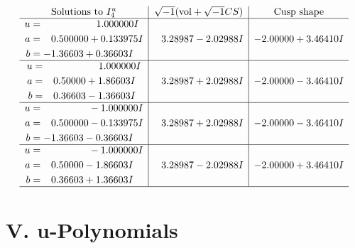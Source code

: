 \documentclass[1p]{elsarticle_modified}
\theoremstyle{definition}
\newcommand{\I}{\sqrt{-1}}
\begin{document}
$$\begin{array}{c|c|c}  
\text{Solutions to }I^u_{4}& \I (\text{vol} + \sqrt{-1}CS) & \text{Cusp shape}\\
 \hline 
\begin{aligned}
u &= \phantom{-0.000000 -}1.000000 I \\
a &= \phantom{-}0.500000 + 0.133975 I \\
b &= -1.36603 + 0.36603 I\end{aligned}
 & \phantom{-}3.28987 - 2.02988 I & -2.00000 + 3.46410 I \\ \hline\begin{aligned}
u &= \phantom{-0.000000 -}1.000000 I \\
a &= \phantom{-}0.50000 + 1.86603 I \\
b &= \phantom{-}0.36603 - 1.36603 I\end{aligned}
 & \phantom{-}3.28987 + 2.02988 I & -2.00000 - 3.46410 I \\ \hline\begin{aligned}
u &= \phantom{-0.000000 } -1.000000 I \\
a &= \phantom{-}0.500000 - 0.133975 I \\
b &= -1.36603 - 0.36603 I\end{aligned}
 & \phantom{-}3.28987 + 2.02988 I & -2.00000 - 3.46410 I \\ \hline\begin{aligned}
u &= \phantom{-0.000000 } -1.000000 I \\
a &= \phantom{-}0.50000 - 1.86603 I \\
b &= \phantom{-}0.36603 + 1.36603 I\end{aligned}
 & \phantom{-}3.28987 - 2.02988 I & -2.00000 + 3.46410 I\\
 \hline 
 \end{array}$$\newpage
\newpage\renewcommand{\arraystretch}{1}
\centering \section*{ V. u-Polynomials}
\end{document}
